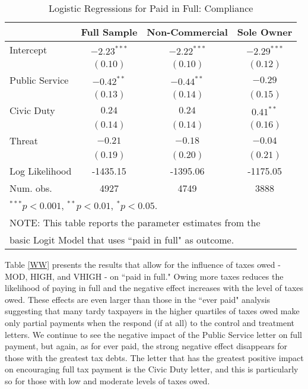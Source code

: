 \documentclass[12pt,titlepage]{article}
\begin{document}
\begin{table}[htbp]
\caption{Logistic Regressions for Paid in Full: Compliance}\label{VV}
\begin{center}
\begin{tabular}{| l c | c | c | }
\hline
               & Full Sample & Non-Commercial & Sole Owner \\
\hline
Intercept      & $-2.23^{***}$ & $-2.22^{***}$ & $-2.29^{***}$ \\
               & $(0.10)$      & $(0.10)$      & $(0.12)$      \\
Public Service          & $-0.42^{**}$  & $-0.44^{**}$  & $-0.29$       \\
               & $(0.13)$      & $(0.14)$      & $(0.15)$      \\
Civic Duty           & $0.24$        & $0.24$        & $0.41^{**}$   \\
               & $(0.14)$      & $(0.14)$      & $(0.16)$      \\
Threat         & $-0.21$       & $-0.18$       & $-0.04$       \\
               & $(0.19)$      & $(0.20)$      & $(0.21)$      \\
\hline
Log Likelihood & -1435.15      & -1395.06      & -1175.05      \\
Num. obs.      & 4927          & 4749          & 3888          \\
\hline
\multicolumn{4}{l}{$^{***}p<0.001$, $^{**}p<0.01$, $^*p<0.05$.} \\
\multicolumn{4}{l}{NOTE: This table reports the parameter estimates from the} \\
\multicolumn{4}{l}{basic Logit Model that uses ``paid in full" as outcome.}
\end{tabular}
\end{center}
\end{table}


Table \ref{WW} presents the results that allow for the influence of
taxes owed - MOD, HIGH, and VHIGH - on ``paid in full."  Owing more
taxes reduces the likelihood of paying in full and the negative effect
increases with the level of taxes owed.  These effects are even larger
than those in the ``ever paid" analysis suggesting that many tardy
taxpayers in the higher quartiles of taxes owed make only partial
payments when the respond (if at all) to the control and treatment
letters.  We continue to see the negative impact of the Public Service
letter on full payment, but again, as for ever paid, the strong
negative effect disappears for those with the greatest tax debts.  The
letter that has the greatest positive impact on encouraging full tax
payment is the Civic Duty letter, and this is particularly so for
those with low and moderate levels of taxes owed.
\end{document}
